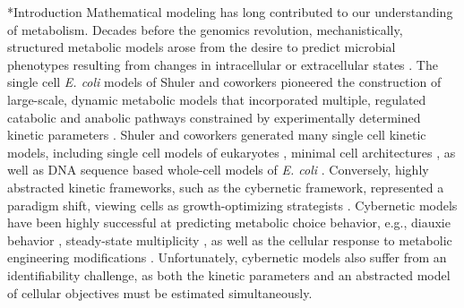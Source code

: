\documentclass[12pt]{article}
\makeatletter
\renewcommand\section{\@startsection
	{subsection}{2}{0mm}
	{-0.2in}
	{0.05\baselineskip}
	{\normalfont\large\bfseries}}
\makeatother
\begin{document}
\section*{Introduction}
Mathematical modeling has long contributed to our understanding of metabolism. 
Decades before the genomics revolution, mechanistically, structured metabolic models arose from the desire to predict microbial phenotypes resulting from changes in intracellular or extracellular states \citep{1976_fredrickson_BiotechBioeng}. 
The single cell \textit{E. coli} models of Shuler and coworkers pioneered the construction of large-scale, dynamic metabolic models that incorporated multiple, regulated catabolic and anabolic pathways constrained by experimentally determined kinetic parameters \citep{1984_domach_shuler_BiotechBioeng_01}. 
Shuler and coworkers generated many single cell kinetic models, including single cell models of eukaryotes \citep{1989_steinmeyer_shuler_ChemEngSci,1992_wu_shuler_AnnNYAcadSci}, minimal cell architectures \citep{2004_castellanos_shuler_PNAS}, as well as DNA sequence based whole-cell models of \textit{E. coli} \citep{2008_atlas_shuler_IETSysBio}.
Conversely, highly abstracted kinetic frameworks, such as the cybernetic framework, represented a paradigm shift, viewing cells as growth-optimizing strategists \citep{1985_dhurjati_ramkrishna_tsao_BiotechBioeng}. 
Cybernetic models have been highly successful at predicting metabolic choice behavior, e.g., diauxie behavior \citep{1986_kompala_ramkrishna_tsao_BiotechBioeng}, steady-state multiplicity \citep{2012_kim_ramkrishna_BiotechProg}, as well as the cellular response to metabolic engineering modifications \citep{1999_varner_ramkrishna_MetaEng}. 
Unfortunately, cybernetic models also suffer from an identifiability challenge, as both the kinetic parameters and an abstracted model of cellular objectives must be estimated simultaneously. 
\end{document}
